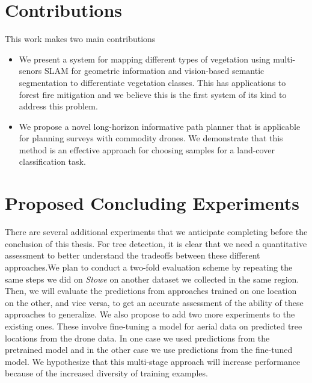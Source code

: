 \section{Contributions}
This work makes two main contributions
\begin{itemize}
    \item We present a system for mapping different types of vegetation using multi-senors  SLAM for geometric information and vision-based semantic segmentation to differentiate vegetation classes. This has applications to forest fire mitigation and we believe this is the first system of its kind to address this problem. 
    \item We propose a novel long-horizon informative path planner that is applicable for planning surveys with commodity drones. We demonstrate that this method is an effective approach for choosing samples for a land-cover classification task.
\end{itemize}

        
\section{Proposed Concluding Experiments}
There are several additional experiments that we anticipate completing before the conclusion of this thesis.
For tree detection, it is clear that we need a quantitative assessment to better understand the tradeoffs between these different approaches.We plan to conduct a two-fold evaluation scheme by repeating the same steps we did on \textit{Stowe} on another dataset we collected in the same region. Then, we will evaluate the predictions from approaches trained on one location on the other, and vice versa, to get an accurate assessment of the ability of these approaches to generalize. We also propose to add two more experiments to the existing ones. These involve fine-tuning a model for aerial data on predicted tree locations from the drone data. In one case we used predictions from the pretrained model and in the other case we use predictions from the fine-tuned model. We hypothesize that this multi-stage approach will increase performance because of the increased diversity of training examples.  

